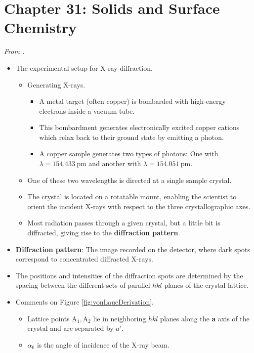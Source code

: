 \documentclass[../notes.tex]{subfiles}
\begin{document}
\section{Chapter 31: Solids and Surface Chemistry}
\emph{From \textcite{bib:McQuarrieSimon}.}
\begin{itemize}
    \item {}The experimental setup for X-ray diffraction.
    \begin{itemize}
        \item Generating X-rays.
        \begin{itemize}
            \item A metal target (often copper) is bombarded with high-energy electrons inside a vacuum tube.
            \item This bombardment generates electronically excited copper cations which relax back to their ground state by emitting a photon.
            \item A copper sample generates two types of photons: One with $\lambda=\SI{154.433}{\pico\meter}$ and another with $\lambda=\SI{154.051}{\pico\meter}$.
        \end{itemize}
        \item One of these two wavelengths is directed at a single sample crystal.
        \item The crystal is located on a rotatable mount, enabling the scientist to orient the incident X-rays with respect to the three crystallographic axes.
        \item Most radiation passes through a given crystal, but a little bit is diffracted, giving rise to the \textbf{diffraction pattern}.
    \end{itemize}
    \item \textbf{Diffraction pattern}: The image recorded on the detector, where dark spots correspond to concentrated diffracted X-rays.
    \item The positions and intensities of the diffraction spots are determined by the spacing between the different sets of parallel $hkl$ planes of the crystal lattice.
    \item Comments on Figure \ref{fig:vonLaueDerivation}.
    \begin{itemize}
        \item Lattice points $\text{A}_1,\text{A}_2$ lie in neighboring $hkl$ planes along the \textbf{a} axis of the crystal and are separated by $a'$.
        \item $\alpha_0$ is the angle of incidence of the X-ray beam.

\end{itemize}
\end{itemize}
\end{document}
